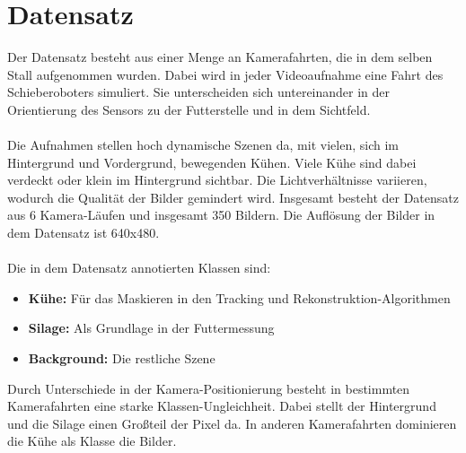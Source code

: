 \documentclass[12pt,DIV=15,BCOR=15mm,twoside,headsepline,abstract=true,listof=totoc,bibliography=totoc]{scrreprt}
\theoremstyle{remark}    %
\begin{document}
    \section{Datensatz}
    Der Datensatz besteht aus einer Menge an Kamerafahrten, die in dem selben Stall aufgenommen wurden. Dabei wird in jeder Videoaufnahme eine Fahrt des 
    Schieberoboters simuliert. Sie unterscheiden sich untereinander in der Orientierung des Sensors zu der Futterstelle und in dem Sichtfeld.\\\\
    Die Aufnahmen stellen hoch dynamische Szenen da, mit vielen, sich im Hintergrund und Vordergrund, bewegenden Kühen. Viele Kühe sind dabei verdeckt oder 
    klein im Hintergrund sichtbar. Die Lichtverhältnisse variieren, wodurch die Qualität der Bilder gemindert wird.
    Insgesamt besteht der Datensatz aus 6 Kamera-Läufen und insgesamt 350 Bildern. Die Auflösung der Bilder in dem Datensatz ist 640x480.\\\\ 
    Die in dem Datensatz annotierten Klassen sind:
    \begin{itemize}
        \item \textbf{Kühe:} Für das Maskieren in den Tracking und Rekonstruktion-Algorithmen
        \item \textbf{Silage:} Als Grundlage in der Futtermessung
        \item \textbf{Background:} Die restliche Szene
    \end{itemize}\noindent
    Durch Unterschiede in der Kamera-Positionierung besteht in bestimmten Kamerafahrten eine starke Klassen-Ungleichheit. Dabei stellt der Hintergrund und die Silage
    einen Großteil der Pixel da. In anderen Kamerafahrten dominieren die Kühe als Klasse die Bilder.
\end{document}
